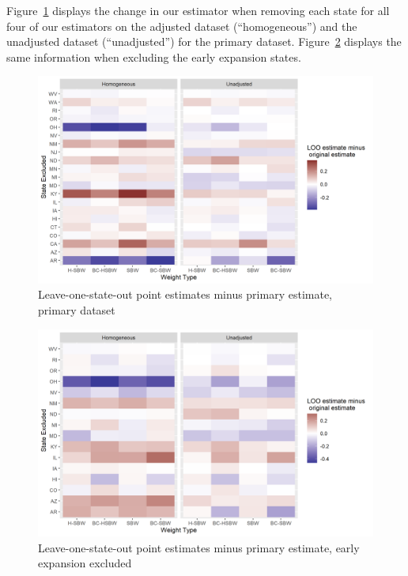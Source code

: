 Figure~\ref{fig:loostateplot} displays the change in our estimator when removing each state for all four of our estimators on the adjusted dataset (``homogeneous'') and the unadjusted dataset (``unadjusted'') for the primary dataset. Figure~\ref{fig:loostateplotc2} displays the same information when excluding the early expansion states. 

\begin{figure}[H]
\begin{center}
    \caption{Leave-one-state-out point estimates minus primary estimate, primary dataset}
    \label{fig:loostateplot}
    \includegraphics[scale=0.6]{01_Plots/loostate-sensitivityc1-proc-uu-avg.png}
\end{center}
\end{figure}

\begin{figure}[H]
\begin{center}
    \caption{Leave-one-state-out point estimates minus primary estimate, early expansion excluded}
    \label{fig:loostateplotc2}
    \includegraphics[scale=0.6]{01_Plots/loostate-sensitivityc2-proc-uu-avg.png}
\end{center}
\end{figure}


